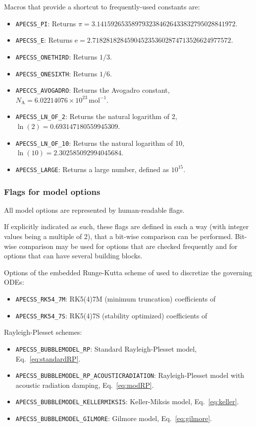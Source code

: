 Macros that provide a shortcut to frequently-used constants are:\vspace{-1em}
\begin{itemize}[noitemsep]
  \item {\tt APECSS\_PI}: Returns $\pi=3.1415926535897932384626433832795028841972$.
  \item {\tt APECSS\_E}: Returns $\mathrm{e}=2.7182818284590452353602874713526624977572$.
  \item {\tt APECSS\_ONETHIRD}: Returns $1/3$.
  \item {\tt APECSS\_ONESIXTH}: Returns $1/6$.
  \item {\tt APECCS\_AVOGADRO}: Returns the Avogadro constant, $N_\mathrm{A}=6.02214076 \times 10^{23} \, \mathrm{mol}^{-1}$.
  \item {\tt APECSS\_LN\_OF\_2}: Returns the natural logarithm of 2, $\ln(2)=0.693147180559945309$.
  \item {\tt APECSS\_LN\_OF\_10}: Returns the natural logarithm of 10, $\ln(10)=2.302585092994045684$.
  \item {\tt APECSS\_LARGE}: Returns a large number, defined as $10^{15}$.
\end{itemize}

\subsubsection{Flags for model options}

All model options are represented by human-readable flags. 

If explicitly indicated as such, these flags are defined in such a way (with integer values being a multiple of 2), that a bit-wise comparison can be performed. Bit-wise comparison may be used for options that are checked frequently and for options that can have several building blocks.

Options of the embedded Runge-Kutta scheme of \citet{Dormand1980} used to discretize the governing ODEs:\vspace{-1em}
\begin{itemize}[noitemsep]
  \item {\tt APECSS\_RK54\_7M}: RK5(4)7M (minimum truncation) coefficients of \citet{Dormand1980}
  \item {\tt APECSS\_RK54\_7S}: RK5(4)7S (stability optimized) coefficients of \citet{Dormand1980}
\end{itemize}

Rayleigh-Plesset schemes:\vspace{-1em}
\begin{itemize}[noitemsep]
  \item {\tt APECSS\_BUBBLEMODEL\_RP}: Standard Rayleigh-Plesset model, Eq.~\eqref{eq:standardRP}.
  \item {\tt APECSS\_BUBBLEMODEL\_RP\_ACOUSTICRADIATION}: Rayleigh-Plesset model with acoustic radiation damping, Eq.~\eqref{eq:modRP}.
  \item {\tt APECSS\_BUBBLEMODEL\_KELLERMIKSIS}: Keller-Miksis model, Eq.~\eqref{eq:keller}.
  \item {\tt APECSS\_BUBBLEMODEL\_GILMORE}: Gilmore model, Eq.~\eqref{eq:gilmore}.
\end{itemize}

